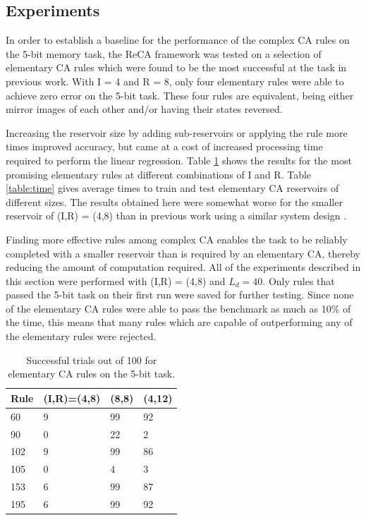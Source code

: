 \documentclass{article}
\begin{document}
\begin{multicols}{2}
\section{Experiments}\label{experiment}
In order to establish a baseline for the performance of the complex CA rules on 
the 5-bit memory task, the ReCA framework was tested on a selection of 
elementary CA rules which were found to be the most successful at the task in 
previous work\cite{yilmaz2014reservoir}\cite{bye2016investigation}. With I = 4 
and R = 8, only four elementary rules were able to achieve zero error on the 
5-bit task. These four rules are equivalent, being either mirror images of each 
other and/or having their states reversed.\par Increasing the reservoir size by 
adding sub-reservoirs or applying the rule more times improved accuracy, but 
came at a cost of increased processing time required to perform the linear 
regression.  Table \ref{table:elementary} shows the results for the most 
promising elementary rules at different combinations of I and R.  Table 
\ref{table:time} gives average times to train and test elementary CA reservoirs 
of different sizes. The results obtained here were somewhat worse for the 
smaller reservoir of (I,R) = (4,8) than in previous work using a similar system 
design  
\cite{bye2016investigation}\cite{yilmaz2014reservoir}\cite{nichele2017reservoir}.  
\par Finding more effective rules among complex CA enables the task to be 
reliably completed with a smaller reservoir than is required by an elementary 
CA, thereby reducing the amount of computation required. All of the experiments 
described in this section were performed with (I,R) = (4,8) and $L_{d} = 40$.  
Only rules that passed the 5-bit task on their first run were saved for further 
testing. Since none of the elementary CA rules were able to pass the benchmark 
as much as 10\% of the time, this means that many rules which are capable of 
outperforming any of the elementary rules were rejected. 


\begin{table}[H]
\begin{tabular}{|l|l|l|l|}
\hline
Rule & (I,R)=(4,8) & (8,8) & (4,12) \\ \hline
60 & 9 & 99 & 92 \\ \hline
90 & 0 & 22 & 2  \\ \hline
102 & 9 & 99 & 86 \\ \hline
105 & 0 & 4 & 3 \\ \hline
153 & 6 & 99 & 87 \\ \hline
195 & 6 & 99 & 92 \\ \hline
\end{tabular}
\caption{Successful trials out of 100 for elementary CA rules on the 5-bit 
    task.}
\label{table:elementary}
\end{table}


\end{multicols}
\end{document}
